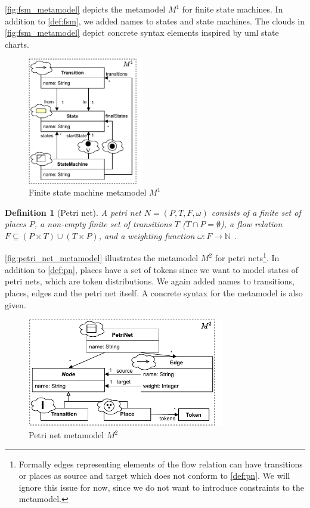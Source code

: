 \documentclass[conference]{IEEEtran}
\newtheorem{definition}{Definition}
\begin{document}
\autoref{fig:fsm_metamodel} depicts the metamodel $M^1$ for finite state machines.
In addition to \autoref{def:fsm}, we added names to states and state machines.
The clouds in \autoref{fig:fsm_metamodel} depict concrete syntax elements inspired by \gls{uml} state charts.

\begin{figure}[h]
    \centering
    \includegraphics[width=2in]{state_machine_metamodel}
    \caption{Finite state machine metamodel $M^1$}
    \label{fig:fsm_metamodel}
\end{figure}

\begin{definition}[Petri net] \label{def:pn}
    A petri net $N=(P,T,F, \omega)$ consists of a finite set of places $P$, a non-empty finite set of transitions $T$ ($T \cap P = \emptyset $), a flow relation $F \subseteq (P \times T) \cup (T \times P)$, and a weighting function $\omega: F \to \mathbb{N}$ \cite{kunzeBehaviouralModelsModelling2016}. %
\end{definition}

\autoref{fig:petri_net_metamodel} illustrates the metamodel $M^2$ for petri nets\footnote{Formally edges representing elements of the flow relation can have transitions or places as source and target which does not conform to \autoref{def:pn}.
We will ignore this issue for now, since we do not want to introduce constraints to the metamodel.}.
In addition to \autoref{def:pn}, places have a set of tokens since we want to model states of petri nets, which are token distributions.
We again added names to transitions, places, edges and the petri net itself.
A concrete syntax for the metamodel is also given.

\begin{figure}[h]
    \centering
    \includegraphics[width=3.4in]{petri_net_metamodel}
    \caption{Petri net metamodel $M^2$}
    \label{fig:petri_net_metamodel}
\end{figure}
\end{document}
